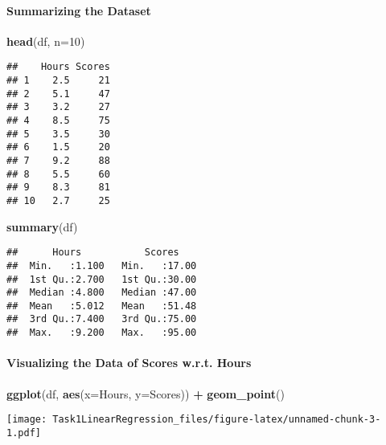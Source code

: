 \documentclass[
]{article}
\newenvironment{Shaded}{\begin{snugshade}}{\end{snugshade}}
\newcommand{\DataTypeTok}[1]{\textcolor[rgb]{0.13,0.29,0.53}{#1}}
\newcommand{\DecValTok}[1]{\textcolor[rgb]{0.00,0.00,0.81}{#1}}
\newcommand{\KeywordTok}[1]{\textcolor[rgb]{0.13,0.29,0.53}{\textbf{#1}}}
\newcommand{\NormalTok}[1]{#1}
\newcommand{\OperatorTok}[1]{\textcolor[rgb]{0.81,0.36,0.00}{\textbf{#1}}}
\newcommand{\StringTok}[1]{\textcolor[rgb]{0.31,0.60,0.02}{#1}}
\begin{document}
\hypertarget{summarizing-the-dataset}{%
\paragraph{Summarizing the Dataset}\label{summarizing-the-dataset}}

\begin{Shaded}
\begin{Highlighting}[]
\KeywordTok{head}\NormalTok{(df, }\DataTypeTok{n=}\DecValTok{10}\NormalTok{)}
\end{Highlighting}
\end{Shaded}

\begin{verbatim}
##    Hours Scores
## 1    2.5     21
## 2    5.1     47
## 3    3.2     27
## 4    8.5     75
## 5    3.5     30
## 6    1.5     20
## 7    9.2     88
## 8    5.5     60
## 9    8.3     81
## 10   2.7     25
\end{verbatim}

\begin{Shaded}
\begin{Highlighting}[]
\KeywordTok{summary}\NormalTok{(df)}
\end{Highlighting}
\end{Shaded}

\begin{verbatim}
##      Hours           Scores     
##  Min.   :1.100   Min.   :17.00  
##  1st Qu.:2.700   1st Qu.:30.00  
##  Median :4.800   Median :47.00  
##  Mean   :5.012   Mean   :51.48  
##  3rd Qu.:7.400   3rd Qu.:75.00  
##  Max.   :9.200   Max.   :95.00
\end{verbatim}

\hypertarget{visualizing-the-data-of-scores-w.r.t.-hours}{%
\paragraph{Visualizing the Data of Scores w.r.t.
Hours}\label{visualizing-the-data-of-scores-w.r.t.-hours}}

\begin{Shaded}
\begin{Highlighting}[]
\KeywordTok{ggplot}\NormalTok{(df, }\KeywordTok{aes}\NormalTok{(}\DataTypeTok{x=}\NormalTok{Hours, }\DataTypeTok{y=}\NormalTok{Scores)) }\OperatorTok{+}\StringTok{ }
\StringTok{  }\KeywordTok{geom_point}\NormalTok{()}
\end{Highlighting}
\end{Shaded}

\texttt{[image: Task1LinearRegression\_files/figure-latex/unnamed-chunk-3-1.pdf]}
\end{document}
